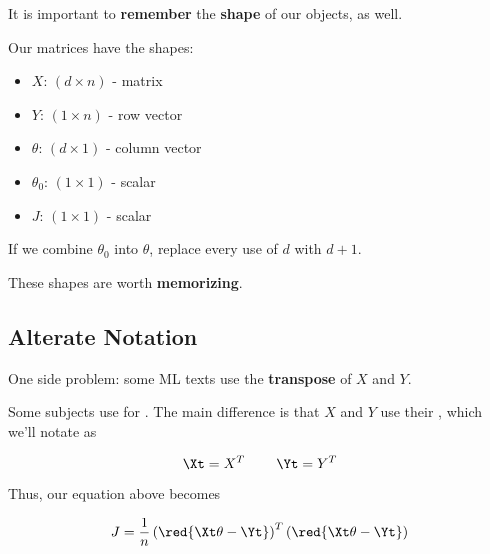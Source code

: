         It is important to \textbf{remember} the \textbf{shape} of our objects, as well.\\
        
        \begin{concept}
            Our matrices have the shapes:
            
            \begin{itemize}
                \item $X$:        $(d \times n)$ - matrix
                \item $Y$:        $(1 \times n)$ - row vector\\
                
                \item $\theta$:   $(d \times 1)$ - column vector
                \item $\theta_0$: $(1 \times 1)$ - scalar\\
                
                \item $J$:        $(1 \times 1)$ - scalar
            \end{itemize}
            
            If we combine $\theta_0$ into $\theta$, replace every use of $d$ with $d+1$.
            
        \end{concept}
        
        
        These shapes are worth \textbf{memorizing}.
        
    \subsection*{Alterate Notation}
    
        One side problem: some ML texts use the \textbf{transpose} of $X$ and $Y$.\\
    
        \begin{notation}
            Some subjects use  for . The main difference is that $X$ and $Y$ use their , which we'll notate as
        
            \begin{equation*}
                \Xt = X^T \;\;\;\;\;\;\;\; \Yt = Y^T
            \end{equation*}
            
            Thus, our equation above becomes
            
            \begin{equation*}
                J = \frac{1}{n}
                    \left( \red{ \Xt \theta  - \Yt } \right)^T
                    \left( \red{ \Xt \theta  - \Yt } \right) 
            \end{equation*}
        \end{notation}